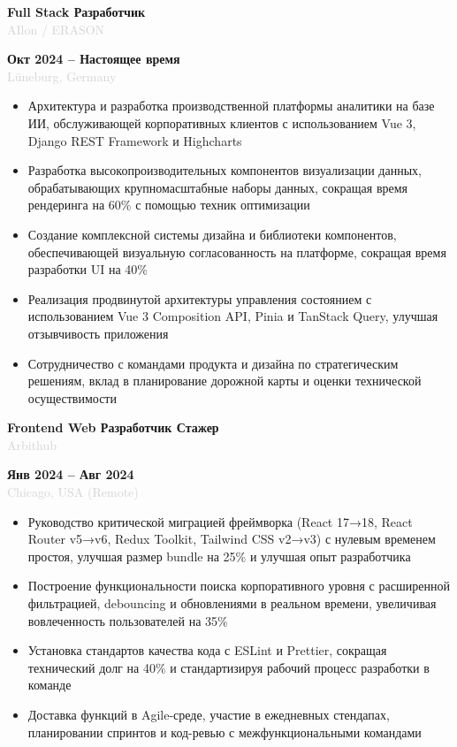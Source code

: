 \documentclass[10pt,a4paper]{article}
\newcommand{\Experience}[4]{%
  \vspace{2pt}
  \noindent
  \begin{minipage}[t]{0.70\textwidth}
    {\normalsize\textbf{\color{darkgray}#3}} \\
    \textcolor{lightgray}{\small #1}
  \end{minipage}%
  \hfill
  \begin{minipage}[t]{0.28\textwidth}
    \raggedleft
    \textcolor{mediumgray}{\small\textbf{#4}} \\
    \textcolor{lightgray}{\small #2}
  \end{minipage}
  \vspace{1pt}
}
\begin{document}
\Experience{AIlon / ERASON}{Lüneburg, Germany}{Full Stack Разработчик}{Окт 2024 -- Настоящее время}
\begin{itemize}
  \item Архитектура и разработка производственной платформы аналитики на базе ИИ, обслуживающей корпоративных клиентов с использованием Vue 3, Django REST Framework и Highcharts
  \item Разработка высокопроизводительных компонентов визуализации данных, обрабатывающих крупномасштабные наборы данных, сокращая время рендеринга на 60\% с помощью техник оптимизации
  \item Создание комплексной системы дизайна и библиотеки компонентов, обеспечивающей визуальную согласованность на платформе, сокращая время разработки UI на 40\%
  \item Реализация продвинутой архитектуры управления состоянием с использованием Vue 3 Composition API, Pinia и TanStack Query, улучшая отзывчивость приложения
  \item Сотрудничество с командами продукта и дизайна по стратегическим решениям, вклад в планирование дорожной карты и оценки технической осуществимости
\end{itemize}

\Experience{Arbithub}{Chicago, USA (Remote)}{Frontend Web Разработчик Стажер}{Янв 2024 -- Авг 2024}
\begin{itemize}
  \item Руководство критической миграцией фреймворка (React 17→18, React Router v5→v6, Redux Toolkit, Tailwind CSS v2→v3) с нулевым временем простоя, улучшая размер bundle на 25\% и улучшая опыт разработчика
  \item Построение функциональности поиска корпоративного уровня с расширенной фильтрацией, debouncing и обновлениями в реальном времени, увеличивая вовлеченность пользователей на 35\%
  \item Установка стандартов качества кода с ESLint и Prettier, сокращая технический долг на 40\% и стандартизируя рабочий процесс разработки в команде
  \item Доставка функций в Agile-среде, участие в ежедневных стендапах, планировании спринтов и код-ревью с межфункциональными командами
\end{itemize}
\end{document}
